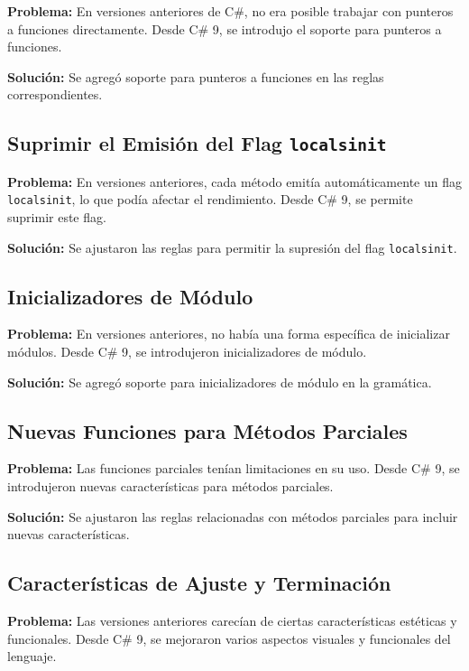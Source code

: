 \textbf{Problema:} En versiones anteriores de C\#, no era posible trabajar con punteros a funciones directamente. Desde C\# 9, se introdujo el soporte para punteros a funciones.

\textbf{Solución:} Se agregó soporte para punteros a funciones en las reglas correspondientes.

\subsection{Suprimir el Emisión del Flag \texttt{localsinit}}

\textbf{Problema:} En versiones anteriores, cada método emitía automáticamente un flag \texttt{localsinit}, lo que podía afectar el rendimiento. Desde C\# 9, se permite suprimir este flag.

\textbf{Solución:} Se ajustaron las reglas para permitir la supresión del flag \texttt{localsinit}.

\subsection{Inicializadores de Módulo}

\textbf{Problema:} En versiones anteriores, no había una forma específica de inicializar módulos. Desde C\# 9, se introdujeron inicializadores de módulo.

\textbf{Solución:} Se agregó soporte para inicializadores de módulo en la gramática.

\subsection{Nuevas Funciones para Métodos Parciales}

\textbf{Problema:} Las funciones parciales tenían limitaciones en su uso. Desde C\# 9, se introdujeron nuevas características para métodos parciales.

\textbf{Solución:} Se ajustaron las reglas relacionadas con métodos parciales para incluir nuevas características.

\subsection{Características de Ajuste y Terminación}

\textbf{Problema:} Las versiones anteriores carecían de ciertas características estéticas y funcionales. Desde C\# 9, se mejoraron varios aspectos visuales y funcionales del lenguaje.

